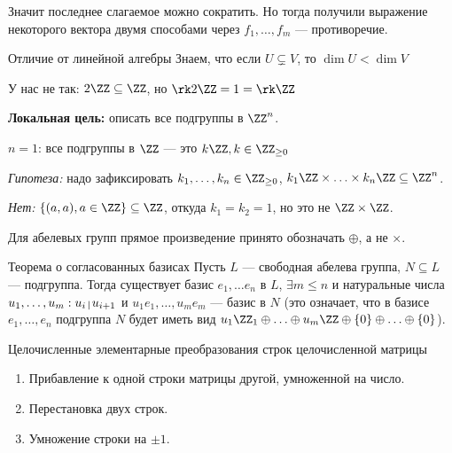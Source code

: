 \begin{itemize}
\begin{enumerate}
                Значит последнее слагаемое можно сократить.
                Но тогда получили выражение некоторого вектора двумя способами через \( f_1, \ldots, f_m \) --- противоречие.
        \end{enumerate}
\end{itemize}

\begin{remark}{Отличие от линейной алгебры}{}
    Знаем, что если \( U \subsetneq V \), то \( \dim U < \dim V \)

    У нас не так: \( 2 \ZZ \subseteq \ZZ \), но \( \rk 2 \ZZ = 1 = \rk \ZZ \)
\end{remark}

\textbf{Локальная цель:} описать все подгруппы в \( \ZZ^n \).

\( n = 1 \): все подгруппы в \( \ZZ \) --- это \( k \ZZ, k \in \ZZ_{\geq 0} \)

\textit{Гипотеза:}
надо зафиксировать \( k_1, \ldots, k_n \in \ZZ_{\geq 0} \),
\( k_1 \ZZ \times \ldots \times k_n \ZZ \subseteq \ZZ^n \).

\textit{Нет:} \( \{ (a, a), a \in \ZZ \} \subseteq \ZZ \), откуда \( k_1 = k_2 = 1 \), но это не \( \ZZ \times \ZZ \).

\begin{defn}{}{}
    Для абелевых групп прямое произведение принято обозначать \( \oplus \), а не \( \times \).
\end{defn}

\begin{thrm}{Теорема о согласованных базисах}{}
    Пусть \( L \) --- свободная абелева группа, \( N \subseteq L \) --- подгруппа.
    Тогда существует базис \( e_1, \ldots e_n \) в \( L \),
    \( \exists m \leq n \) и натуральные числа \( u_1, \ldots, u_m : u_i \: \vline \: u_{i + 1} \)
    и \( u_1 e_1, \ldots, u_m e_m \) --- базис в \( N \)
    (это означает, что в базисе \( e_1, \ldots, e_n \) подгруппа \( N \) будет иметь вид
    \( u_1 \ZZ_1 \oplus \ldots \oplus u_m \ZZ \oplus \{ 0 \} \oplus \ldots \oplus \{ 0 \} \)). 
\end{thrm}

\begin{defn}{Целочисленные элементарные преобразования строк целочисленной матрицы}{}
    \begin{enumerate}
        \item
            Прибавление к одной строки матрицы другой,
            умноженной на число.
        \item
            Перестановка двух строк.
        \item
            Умножение строки на \( \pm 1 \).
    \end{enumerate}
\end{defn}


